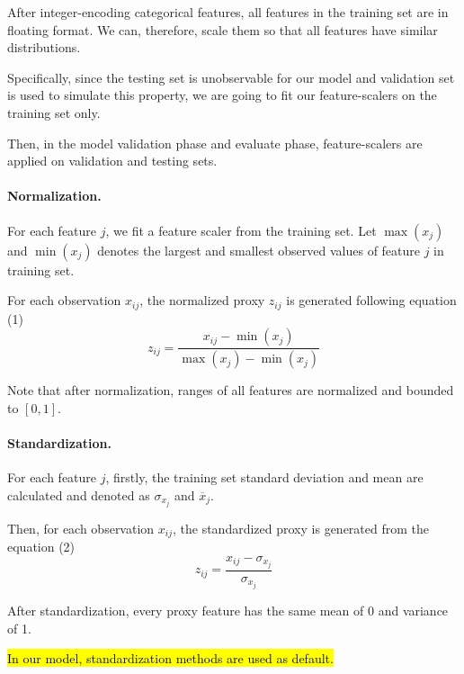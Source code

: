\documentclass{article}
\begin{document}
                After integer-encoding categorical features, all features in the training set are in floating format. We can, therefore, scale them so that all features have similar distributions.
                
                Specifically, since the testing set is unobservable for our model and validation set is used to simulate this property, we are going to fit our feature-scalers on the training set only.
                
                Then, in the model validation phase and evaluate phase, feature-scalers are applied on validation and testing sets.
				
				\paragraph{Normalization.} For each feature $j$, we fit a feature scaler from the training set. Let $\max(x_j)$ and $\min(x_j)$ denotes the largest and smallest observed values of feature $j$ in training set.
				
				For each observation $x_{ij}$, the normalized proxy $z_{ij}$ is generated following equation (1)
				\begin{equation}
					z_{ij} = \frac{x_{ij} - \min(x_j)}{\max(x_j) - \min(x_j)}
				\end{equation}
				
				Note that after normalization, ranges of all features are normalized and bounded to $[0,1]$.
				
				\paragraph{Standardization.} For each feature $j$, firstly, the training set standard deviation and mean are calculated and denoted as $\sigma_{x_j}$ and $\overline{x}_j$.
				
				Then, for each observation $x_{ij}$, the standardized proxy is generated from the equation (2)
				\begin{equation}
					z_{ij} = \frac{x_{ij} - \sigma_{x_j}}{\sigma_{x_j}}
				\end{equation}
				
				After standardization, every proxy feature has the same mean of $0$ and variance of 1.
				
				\begin{remark}
					\hl{In our model, standardization methods are used as default.}		
				\end{remark}
\end{document}
